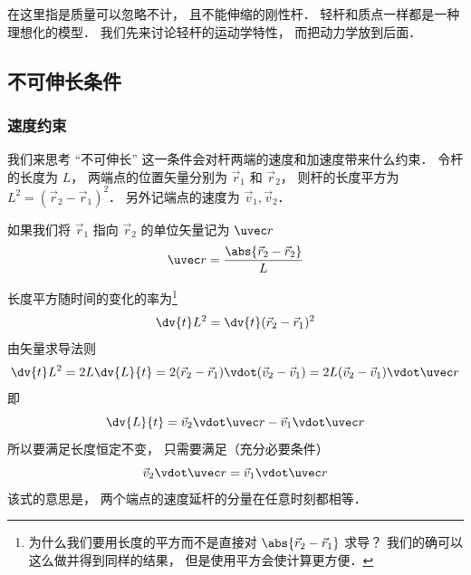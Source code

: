 

在这里指是质量可以忽略不计， 且不能伸缩的刚性杆． 轻杆和质点一样都是一种理想化的模型． 我们先来讨论轻杆的运动学特性， 而把动力学放到后面．

\subsection{不可伸长条件}
\subsubsection{速度约束}
我们来思考 “不可伸长” 这一条件会对杆两端的速度和加速度带来什么约束． 令杆的长度为 $L$， 两端点的位置矢量分别为 $\vec r_1$ 和 $\vec r_2$， 则杆的长度平方为 $L^2 = (\vec r_2 - \vec r_1)^2$． 另外记端点的速度为 $\vec v_1, \vec v_2$．

如果我们将 $\vec r_1$ 指向 $\vec r_2$ 的单位矢量记为 $\uvec r$
\begin{equation}
\uvec r = \frac{\abs{\vec r_2 - \vec r_2}}{L}
\end{equation}

长度平方随时间的变化的率为\footnote{为什么我们要用长度的平方而不是直接对 $\abs{\vec r_2 - \vec r_1}$ 求导？ 我们的确可以这么做并得到同样的结果， 但是使用平方会使计算更方便．}
\begin{equation}\label{rod_eq2}
\dv{t} L^2 = \dv{t} (\vec r_2 - \vec r_1)^2
\end{equation}
由矢量求导法则
\begin{equation}\label{rod_eq1}
\dv{t} L^2 = 2L \dv{L}{t} = 2 (\vec r_2 - \vec r_1) \vdot (\vec v_2 - \vec v_1) = 2L (\vec v_2 - \vec v_1) \vdot \uvec r
\end{equation}
即
\begin{equation}\label{rod_eq6}
\dv{L}{t} = \vec v_2 \vdot \uvec r - \vec v_1 \vdot \uvec r
\end{equation}
所以要满足长度恒定不变， 只需要满足（充分必要条件）
\begin{equation}\label{rod_eq3}
\vec v_2 \vdot \uvec r = \vec v_1 \vdot \uvec r
\end{equation}
该式的意思是， 两个端点的速度延杆的分量在任意时刻都相等．


